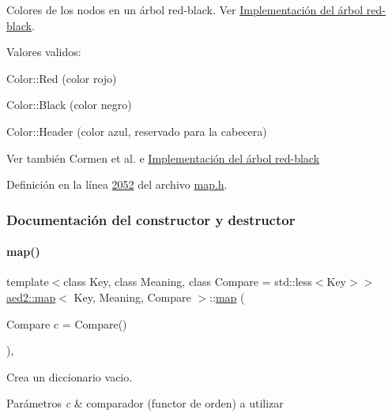 Colores de los nodos en un árbol red-\/black. Ver \hyperlink{Implementacion}{Implementación del árbol red-\/black}. 

Valores validos\+: \begin{DoxyItemize}
\item Color\+::\+Red (color rojo) \item Color\+::\+Black (color negro) \item Color\+::\+Header (color azul, reservado para la cabecera)\end{DoxyItemize}
\begin{DoxySeeAlso}{Ver también}
Cormen et al. \cite{CormenLeisersonRivestStein2009} e \hyperlink{Implementacion}{Implementación del árbol red-\/black} 
\end{DoxySeeAlso}


Definición en la línea \hyperlink{map_8h_source_l02052}{2052} del archivo \hyperlink{map_8h_source}{map.\+h}.



\subsubsection{Documentación del constructor y destructor}
\mbox{\label{classaed2_1_1map_a64da1d965b13eb28cdb3837bc17a18cf_a64da1d965b13eb28cdb3837bc17a18cf}} 
\paragraph{\texorpdfstring{map()}{map()}\hspace{0.1cm}{\footnotesize\ttfamily [1/3]}}
{\footnotesize\ttfamily template$<$class Key, class Meaning, class Compare = std\+::less$<$\+Key$>$$>$ \\
\hyperlink{classaed2_1_1map}{aed2\+::map}$<$ Key, Meaning, Compare $>$\+::\hyperlink{classaed2_1_1map}{map} (\begin{DoxyParamCaption}\item[{Compare}]{c = {\ttfamily Compare()} }\end{DoxyParamCaption})\hspace{0.3cm}{\ttfamily [inline]}, {\ttfamily [explicit]}}



Crea un diccionario vacio. 


\begin{DoxyParams}{Parámetros}
{\em c} & comparador (functor de orden) a utilizar \\
\hline
\end{DoxyParams}

